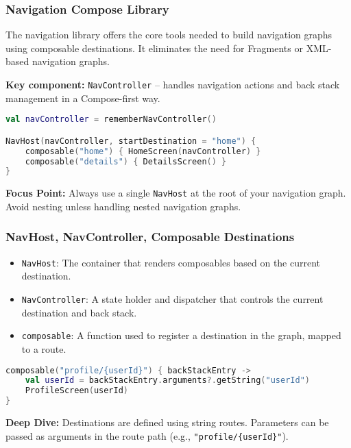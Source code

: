 \documentclass[a4paper,12pt]{article}
\begin{document}
\subsubsection{Navigation Compose Library}

The navigation library offers the core tools needed to build navigation graphs using composable destinations. It eliminates the need for Fragments or XML-based navigation graphs.

\textbf{Key component:} \texttt{NavController} – handles navigation actions and back stack management in a Compose-first way.

\begin{lstlisting}[language=Kotlin]
val navController = rememberNavController()

NavHost(navController, startDestination = "home") {
    composable("home") { HomeScreen(navController) }
    composable("details") { DetailsScreen() }
}
\end{lstlisting}

\textbf{Focus Point:} Always use a single \texttt{NavHost} at the root of your navigation graph. Avoid nesting unless handling nested navigation graphs.

\subsubsection{NavHost, NavController, Composable Destinations}

\begin{itemize}
    \item \texttt{NavHost}: The container that renders composables based on the current destination.
    \item \texttt{NavController}: A state holder and dispatcher that controls the current destination and back stack.
    \item \texttt{composable}: A function used to register a destination in the graph, mapped to a route.
\end{itemize}

\begin{lstlisting}[language=Kotlin]
composable("profile/{userId}") { backStackEntry ->
    val userId = backStackEntry.arguments?.getString("userId")
    ProfileScreen(userId)
}
\end{lstlisting}

\textbf{Deep Dive:} Destinations are defined using string routes. Parameters can be passed as arguments in the route path (e.g., \texttt{"profile/\{userId\}"}).
\end{document}
